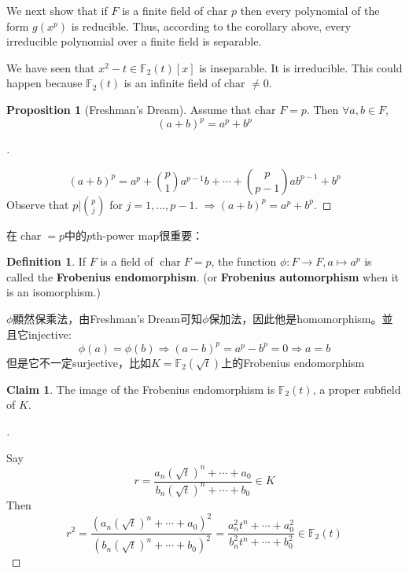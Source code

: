 \documentclass{article}
\theoremstyle{definition}
\newtheorem{dfn}{Definition}
\newtheorem{cor}{Corollary}
\newtheorem{prop}{Proposition}
\newtheorem*{clm}{Claim}
\newenvironment{proofs}[1][\proofname]{%
  \begin{proof}[#1]$ $\par\nobreak\ignorespaces
}{%
  \end{proof}
}
\DeclareMathOperator{\Char}{char}
\begin{document}
We next show that if $F$ is a finite field of $\text{char } p$ then every polynomial of the form $g(x^p)$ is reducible.
Thus, according to the corollary above, every irreducible polynomial over a finite field is separable.

\begin{ex}
We have seen that $x^2 - t \in \mathbb{F}_2(t)[x]$ is inseparable.
It is irreducible.
This could happen because $\mathbb{F}_2(t)$ is an infinite field of $\text{char } \neq 0$.
\end{ex}

\begin{prop}[Freshman's Dream]
Assume that $\text{char } F = p$.
Then $\forall a, b \in F$, 
\[
(a + b)^p = a^p + b^p
\]
\end{prop}

\begin{proofs}
\[
(a + b)^p = a^p + \binom{p}{1} a^{p - 1} b + \cdots + \binom{p}{p - 1} a b^{p - 1} + b^p
\]
Observe that $p | \binom{p}{j}$ for $j = 1, ..., p - 1$.
$\Rightarrow (a + b)^p = a^p + b^p$.
\end{proofs}



在$\Char=p$中的$p$th-power map很重要： 
\begin{dfn}
	If $F$ is a field of $\Char F=p$, the function $\phi: F\to F, a \mapsto a^p$ is called the \textbf{Frobenius endomorphism}. (or \textbf{Frobenius automorphism} when it is an isomorphism.)
\end{dfn}
$\phi$顯然保乘法，由Freshman's Dream可知$\phi$保加法，因此他是homomorphism。並且它injective:
\[\phi(a)=\phi(b)\Rightarrow (a-b)^p=a^p-b^p=0 \Rightarrow a=b\]
但是它不一定surjective，比如$K = \mathbb{F}_2(\sqrt{t})$上的Frobenius endomorphism
\begin{clm}
The image of the Frobenius endomorphism is $\mathbb{F}_2(t)$, a proper subfield of $K$.
\end{clm}

\begin{proofs}
Say 
\[
	r = \frac{a_n (\sqrt{t})^n + \cdots + a_0}{b_n (\sqrt{t})^n + \cdots + b_0} \in K
	\]
	Then 
	\[
r^2 =\frac{\left(a_n (\sqrt{t})^n + \cdots + a_0\right)^2}{\left(b_n (\sqrt{t})^n + \cdots + b_0\right)^2} = \frac{a_n^2 t^n + \cdots + a_0^2}{b_n^2 t^n+ \cdots + b_0^2} \in \mathbb{F}_2(t)
\]
\end{proofs}
\end{document}
